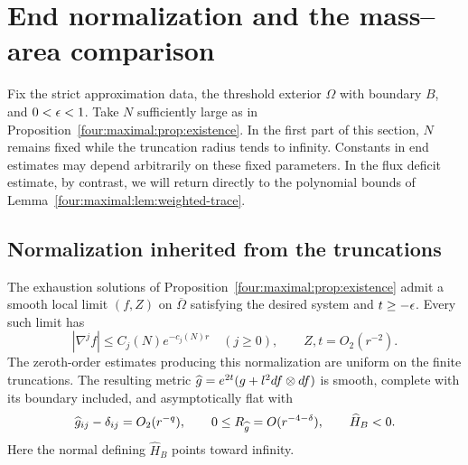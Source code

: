 \section{End normalization and the mass--area comparison}
\label{four:maximal:sec:comparison}

Fix the strict approximation data, the threshold exterior $\Omega$ with
boundary $B$, and $0<\epsilon<1$.  Take $N$ sufficiently large as in
Proposition~\ref{four:maximal:prop:existence}.  In the first part of this section, $N$
remains fixed while the truncation radius tends to infinity.  Constants
in end estimates may depend arbitrarily on these fixed parameters.  In
the flux deficit estimate, by contrast, we will return directly to the
polynomial bounds of Lemma~\ref{four:maximal:lem:weighted-trace}.

\subsection{Normalization inherited from the truncations}

\begin{proposition}\label{four:maximal:prop:end-control}
The exhaustion solutions of Proposition~\ref{four:maximal:prop:existence} admit a
smooth local limit $(f,Z)$ on $\overline\Omega$ satisfying the desired
system and $t\ge-\epsilon$.  Every such limit has
\begin{equation}\label{four:maximal:end:decay}
 |\nabla^j f|\le C_j(N)e^{-c_j(N)r}\quad(j\ge0),
 \qquad Z,t=O_2(r^{-2}).
\end{equation}
The zeroth-order estimates producing this normalization are uniform on
the finite truncations.  The resulting metric
$\widehat g=e^{2t}(g+l^2df\otimes df)$ is smooth, complete with its boundary
included, and asymptotically flat with
\begin{equation}\label{four:maximal:end:geometry}
 \widehat g_{ij}-\delta_{ij}=O_2(r^{-q}),\qquad
 0\le R_{\widehat g}=O(r^{-4-\delta}),\qquad \widehat H_B<0.
\end{equation}
Here the normal defining $\widehat H_B$ points toward infinity.
\end{proposition}

